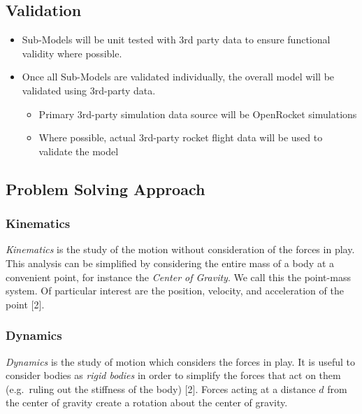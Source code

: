 \documentclass[]{article}
\providecommand{\tightlist}{%
  \setlength{\itemsep}{0pt}\setlength{\parskip}{0pt}}
\begin{document}
\subsection{Validation}\label{validation}

\begin{itemize}
\tightlist
\item
  Sub-Models will be unit tested with 3rd party data to ensure
  functional validity where possible.
\item
  Once all Sub-Models are validated individually, the overall model will
  be validated using 3rd-party data.

  \begin{itemize}
  \tightlist
  \item
    Primary 3rd-party simulation data source will be OpenRocket
    simulations
  \item
    Where possible, actual 3rd-party rocket flight data will be used to
    validate the model
  \end{itemize}
\end{itemize}

\subsection{Problem Solving Approach}\label{problem-solving-approach}

\subsubsection{Kinematics}\label{kinematics}

\emph{Kinematics} is the study of the motion without consideration of
the forces in play. This analysis can be simplified by considering the
entire mass of a body at a convenient point, for instance the
\emph{Center of Gravity}. We call this the point-mass system. Of
particular interest are the position, velocity, and acceleration of the
point {[}2{]}.

\subsubsection{Dynamics}\label{dynamics}

\emph{Dynamics} is the study of motion which considers the forces in
play. It is useful to consider bodies as \emph{rigid bodies} in order to
simplify the forces that act on them (e.g.~ruling out the stiffness of
the body) {[}2{]}. Forces acting at a distance \(d\) from the center of
gravity create a rotation about the center of gravity.
\end{document}
